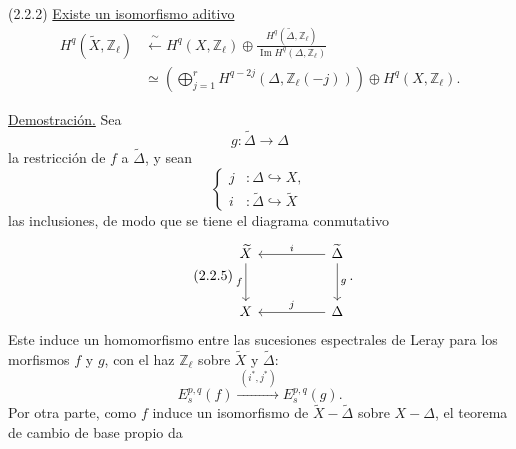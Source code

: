 \pageoriginale

\medskip
\noindent(2.2.2) \underline{Existe un isomorfismo aditivo}
\[
\begin{aligned}
H^q(\widetilde X,\mathbb Z_\ell)
&\xleftarrow{\ \sim\ }
H^q(X,\mathbb Z_\ell)\oplus
\frac{H^q(\widetilde\Delta,\mathbb Z_\ell)}
     {\operatorname{Im}H^q(\Delta,\mathbb Z_\ell)}
\\
&\simeq
\left(\bigoplus_{j=1}^{r}
H^{q-2j}(\Delta,\mathbb Z_\ell(-j))\right)
\oplus H^q(X,\mathbb Z_\ell).
\end{aligned}
\]

\noindent\underline{Demostración.}
Sea
\begin{equation}\tag{2.2.3}
g:\widetilde\Delta\longrightarrow\Delta
\end{equation}
la restricción de $f$ a $\widetilde\Delta$, y sean
\begin{equation}\tag{2.2.4}
\left\{
\begin{aligned}
j&:\Delta\hookrightarrow X,\\
i&:\widetilde\Delta\hookrightarrow\widetilde X
\end{aligned}
\right.
\end{equation}
las inclusiones, de modo que se tiene el diagrama conmutativo
\begin{equation}\tag{2.2.5}
\begin{tikzcd}[column sep=huge,row sep=large]
\widetilde X \arrow[d,"f"'] &
\widetilde\Delta \arrow[l,"i"'] \arrow[d,"g"]\\
X & \Delta \arrow[l,"j"']
\end{tikzcd}.
\end{equation}
Este induce un homomorfismo entre las sucesiones espectrales de Leray
para los morfismos $f$ y $g$, con el haz $\mathbb Z_\ell$ sobre
$\widetilde X$ y $\widetilde\Delta$:
\begin{equation}\tag{2.2.6}
E_s^{p,q}(f)\xrightarrow{\ (i^*,j^*)\ }E_s^{p,q}(g).
\end{equation}
Por otra parte, como $f$ induce un isomorfismo de
$\widetilde X-\widetilde\Delta$ sobre $X-\Delta$, el teorema de cambio
de base propio da

\pageoriginale

